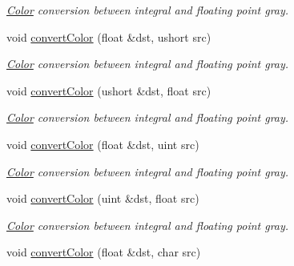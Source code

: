 \begin{DoxyCompactItemize}
\begin{DoxyCompactList}\small\item\em \hyperlink{class_d_o_1_1_color}{Color} conversion between integral and floating point gray. \end{DoxyCompactList}\item 
\hypertarget{group___color_conversion_ga507e4121b2a6e960d6b7083357f7d6a9}{void \hyperlink{group___color_conversion_ga507e4121b2a6e960d6b7083357f7d6a9}{convert\-Color} (float \&dst, ushort src)}\label{group___color_conversion_ga507e4121b2a6e960d6b7083357f7d6a9}

\begin{DoxyCompactList}\small\item\em \hyperlink{class_d_o_1_1_color}{Color} conversion between integral and floating point gray. \end{DoxyCompactList}\item 
\hypertarget{group___color_conversion_ga0e51479a8743f6c8557bf4ebc68b6868}{void \hyperlink{group___color_conversion_ga0e51479a8743f6c8557bf4ebc68b6868}{convert\-Color} (ushort \&dst, float src)}\label{group___color_conversion_ga0e51479a8743f6c8557bf4ebc68b6868}

\begin{DoxyCompactList}\small\item\em \hyperlink{class_d_o_1_1_color}{Color} conversion between integral and floating point gray. \end{DoxyCompactList}\item 
\hypertarget{group___color_conversion_ga05deb3c453589c91dec56d5426c521fe}{void \hyperlink{group___color_conversion_ga05deb3c453589c91dec56d5426c521fe}{convert\-Color} (float \&dst, uint src)}\label{group___color_conversion_ga05deb3c453589c91dec56d5426c521fe}

\begin{DoxyCompactList}\small\item\em \hyperlink{class_d_o_1_1_color}{Color} conversion between integral and floating point gray. \end{DoxyCompactList}\item 
\hypertarget{group___color_conversion_ga7cd3b0184666f16f54713ddb9b7ba408}{void \hyperlink{group___color_conversion_ga7cd3b0184666f16f54713ddb9b7ba408}{convert\-Color} (uint \&dst, float src)}\label{group___color_conversion_ga7cd3b0184666f16f54713ddb9b7ba408}

\begin{DoxyCompactList}\small\item\em \hyperlink{class_d_o_1_1_color}{Color} conversion between integral and floating point gray. \end{DoxyCompactList}\item 
\hypertarget{group___color_conversion_gae6e303ccb39b66575d4dca9e3cf7f125}{void \hyperlink{group___color_conversion_gae6e303ccb39b66575d4dca9e3cf7f125}{convert\-Color} (float \&dst, char src)}\label{group___color_conversion_gae6e303ccb39b66575d4dca9e3cf7f125}


\end{DoxyCompactItemize}
